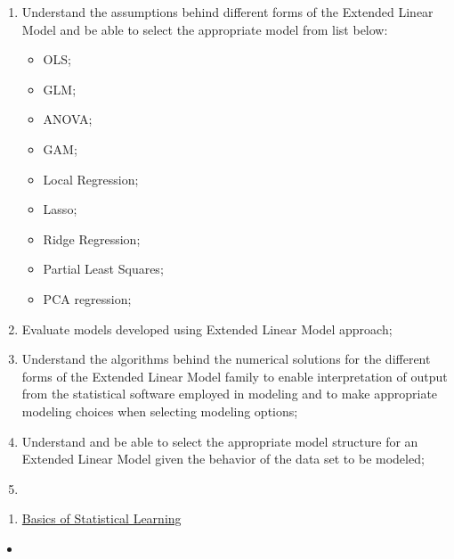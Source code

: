 \documentclass[12pt, titlepage, french]{report}
\begin{document}
\begin{outcomes}
\begin{enumerate}
	\item	Understand the assumptions behind different forms of the Extended Linear Model and be able to select the appropriate model from list below:
	\begin{multicols*}{2}
		\begin{itemize}
		\item	OLS;
		\item	GLM;
		\item	ANOVA;
		\item	GAM;
		\item	Local Regression;
		\item	Lasso;
		\item	Ridge Regression;
		\item	Partial Least Squares;
		\item	PCA regression;
		\end{itemize}
	\end{multicols*}
\tcbline
	\item	Evaluate models developed using Extended Linear Model approach;
\tcbline
	\item	Understand the algorithms behind the numerical solutions for the different forms of the Extended Linear Model family to enable interpretation of output from the statistical software employed in modeling and to make appropriate modeling choices when selecting modeling options;
\tcbline
	\item	Understand and be able to select the appropriate model structure for an Extended Linear Model given the behavior of the data set to be modeled;
\tcbline
	\item	
\tcbline
\end{enumerate}
\end{outcomes}

\begin{ASM_chapter}
\begin{enumerate}
	\item	\hyperref[BASICS]{Basics of Statistical Learning}
\end{enumerate}
\end{ASM_chapter}

\begin{YTB_vids}
\begin{itemize}
	\item	
\end{itemize}
\end{YTB_vids}
\end{document}
